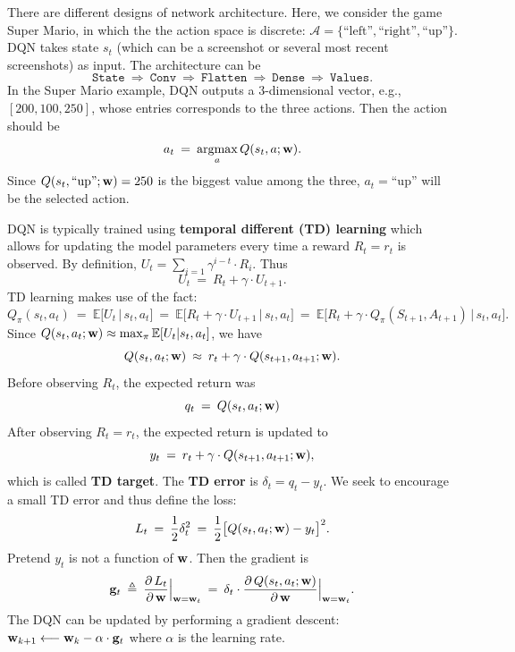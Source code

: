\documentclass[11pt]{article}
\numberwithin{equation}{section}
\def\g{{\bf g}}
\def\w{{\bf w}}
\def\AM{{\mathcal A}}
\def\EB{{\mathbb E}}
\def\argmax{\mathop{\rm argmax}}
\def\argmax{\mathop{\rm argmax}}
\begin{document}
There are different designs of network architecture.
Here, we consider the game Super Mario, in which the the action space is discrete: $\AM = \{ \textrm{``left''} , \textrm{``right''}, \textrm{``up''}\}$.
DQN takes state $s_t$ (which can be a screenshot or several most recent screenshots) as input.
The architecture can be 
\begin{equation*}
    \texttt{State} 
    \: \Rightarrow \: 
    \texttt{Conv}
    \: \Rightarrow \: 
    \texttt{Flatten}
    \: \Rightarrow \: 
    \texttt{Dense} 
    \: \Rightarrow \: 
    \texttt{Values} .
\end{equation*}
In the Super Mario example, DQN outputs a 3-dimensional vector, e.g., $ [200, 100, 250]$, whose entries corresponds to the three actions.
Then the action should be 
\begin{equation*}
    a_t \: = \: \argmax_{a} Q (s_t , a ; \w ).
\end{equation*}
Since $Q (s_t , \textrm{``up''} ; \w ) = 250$ is the biggest value among the three,
$a_t=$``up'' will be the selected action.



DQN is typically trained using \textbf{temporal different (TD) learning} \cite{sutton2008convergent,sutton2009fast} which allows for updating the model parameters every time a reward $R_t=r_t$ is observed.
By definition, $U_t = \sum_{i=1} \gamma^{i-t} \cdot R_i$.
Thus 
\begin{equation*}
    U_{t} \: = \: R_t + \gamma \cdot U_{t+1}.
\end{equation*}
TD learning makes use of the fact:
\begin{equation*}
    Q_\pi (s_t, a_t)
    \: = \:
    \EB \big[U_{t} \, \big| \, s_t , a_t \big] 
    \: = \: \EB \big[ R_t + \gamma \cdot U_{t+1} \, \big| \, s_t , a_t \big]
    \: = \: \EB \big[ R_t + \gamma \cdot Q_\pi (S_{t+1}, A_{t+1}) \, \big| \, s_t , a_t \big].
\end{equation*}
Since $Q (s_t, a_t; \w) \approx \max_{\pi} \EB [U_t | s_t, a_t]$, we have
\begin{equation*}
    Q (s_t, a_t; \w)  \: \approx \:  r_t + \gamma \cdot Q (s_{t+1}, a_{t+1}; \w) . 
\end{equation*}
Before observing $R_t$, the expected return was
\[
q_t \: = \: Q(s_t , a_t; \w)
\]
After observing $R_t=r_t$, the expected return is updated to
\[
y_t \: = \: r_t + \gamma \cdot Q(s_{t+1} , a_{t+1}; \w),
\]
which is called \textbf{TD target}.
The \textbf{TD error} is $\delta_t = q_t - y_t$.
We seek to encourage a small TD error and thus define the loss:
\begin{equation*}
    L_t \: = \: \frac{1}{2} \delta_t^2 \: = \: \frac{1}{2} \big[ Q (s_t , a_t ; \w ) - y_t \big]^2 .
\end{equation*}
Pretend $y_t$ is not a function of $\w$.
Then the gradient is
\begin{equation*}
    \g_t
    \: \triangleq \: \frac{\partial \, L_t }{\partial \, \w } \Big|_{\w=\w_t }
    \: = \: \delta_t \cdot \frac{\partial \, Q (s_t , a_t ; \w ) }{\partial \, \w } \Big|_{\w=\w_t } .
\end{equation*}
The DQN can be updated by performing a gradient descent: $\w_{k+1} \longleftarrow \w_{k} - \alpha \cdot \g_t $ where $\alpha$ is the learning rate.
\end{document}
